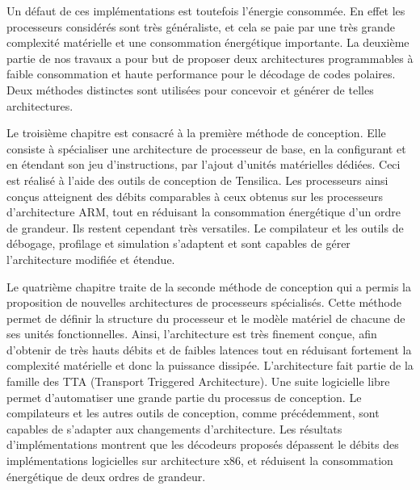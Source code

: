 Un défaut de ces implémentations est toutefois l'énergie consommée. En effet les processeurs considérés sont très généraliste, et cela se paie par une très grande complexité matérielle et une consommation énergétique importante. La deuxième partie de nos travaux a pour but de proposer deux architectures programmables à faible consommation et haute performance pour le décodage de codes polaires. Deux méthodes distinctes sont utilisées pour concevoir et générer de telles architectures.

Le troisième chapitre est consacré à la première méthode de conception. Elle consiste à spécialiser une architecture de processeur de base, en la configurant et en étendant son jeu d'instructions, par l'ajout d'unités matérielles dédiées. Ceci est réalisé à l'aide des outils de conception de Tensilica. Les processeurs ainsi conçus atteignent des débits comparables à ceux obtenus sur les processeurs d'architecture ARM, tout en réduisant la consommation énergétique d'un ordre de grandeur. Ils restent cependant très versatiles. Le compilateur et les outils de débogage, profilage et simulation s'adaptent et sont capables de gérer l'architecture modifiée et étendue.

Le quatrième chapitre traite de la seconde méthode de conception qui a permis la proposition de nouvelles architectures de processeurs spécialisés. Cette méthode permet de définir la structure du processeur et le modèle matériel de chacune de ses unités fonctionnelles. Ainsi, l'architecture est très finement conçue, afin d'obtenir de très hauts débits et de faibles latences tout en réduisant fortement la complexité matérielle et donc la puissance dissipée. L'architecture fait partie de la famille des TTA (Transport Triggered Architecture). Une suite logicielle libre permet d'automatiser une grande partie du processus de conception. Le compilateurs et les autres outils de conception, comme précédemment, sont capables de s'adapter aux changements d'architecture. Les résultats d'implémentations montrent que les décodeurs proposés dépassent le débits des implémentations logicielles sur architecture x86, et réduisent la consommation énergétique de deux ordres de grandeur.

\clearpage

